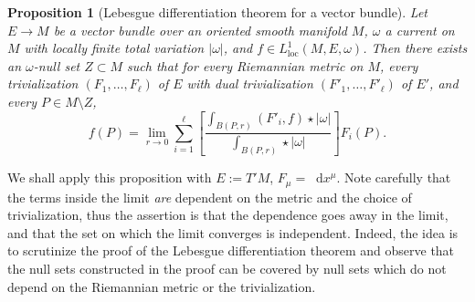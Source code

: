 \documentclass[reqno,11pt]{amsart}
\newcommand*\dif{\mathop{}\!\mathrm{d}}
\newcommand{\loc}{\mathrm{loc}}
\newtheorem{proposition}[theorem]{Proposition}
\theoremstyle{definition}
\numberwithin{equation}{section}
\begin{document}
\begin{proposition}[Lebesgue differentiation theorem for a vector bundle]\label{LebesgueDiff}
Let $E \to M$ be a vector bundle over an oriented smooth manifold $M$, $\omega$ a current on $M$ with locally finite total variation $|\omega|$, and $f \in L^1_\loc(M, E, \omega)$.
Then there exists an $\omega$-null set $Z \subset M$ such that for every Riemannian metric on $M$, every trivialization $(F_1, \dots, F_\ell)$ of $E$ with dual trivialization $(F'_1, \dots, F'_\ell)$ of $E'$, and every $P \in M \setminus Z$,
$$f(P) = \lim_{r \to 0} \sum_{i=1}^\ell \left[\frac{\int_{B(P, r)} (F'_i, f) \star |\omega|}{\int_{B(P, r)} \star |\omega|}\right] F_i(P).$$
\end{proposition}

We shall apply this proposition with $E := T'M$, $F_\mu = \dif x^\mu$.
Note carefully that the terms inside the limit \emph{are} dependent on the metric and the choice of trivialization, thus the assertion is that the dependence goes away in the limit, and that the set on which the limit converges is independent.
Indeed, the idea is to scrutinize the proof of the Lebesgue differentiation theorem \cite[Chapter 3, Theorem 1.3]{stein2009real} and observe that the null sets constructed in the proof can be covered by null sets which do not depend on the Riemannian metric or the trivialization.
\end{document}
